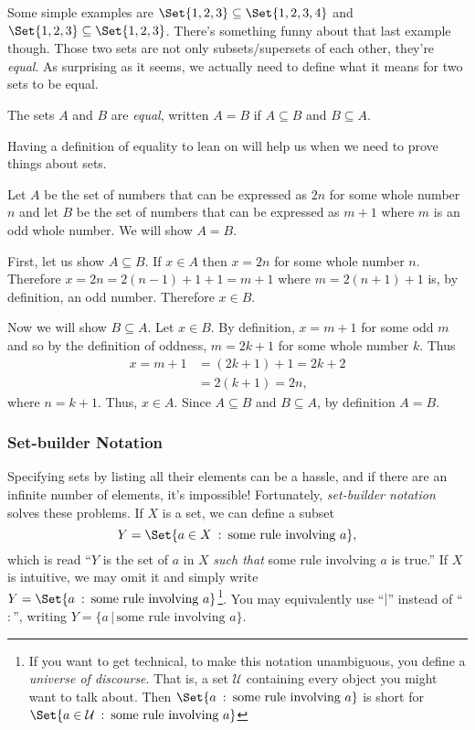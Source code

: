 	Some simple examples are $\Set{1,2,3}\subseteq \Set{1,2,3,4}$ and $\Set{1,2,3}\subseteq\Set{1,2,3}$.
	There's something funny about that last example though.  Those two sets are not only subsets/supersets
	of each other, they're \emph{equal}.  As surprising as it seems, we actually need to define
	what it means for two sets to be equal.
	\begin{definition}
		The sets $A$ and $B$ are \emph{equal}, written $A=B$ if $A\subseteq B$ and $B\subseteq A$.
	\end{definition}
	Having a definition of equality to lean on will help us when we need to prove things about sets.

	\begin{example}
		Let $A$ be the set of numbers that can be expressed
		as $2n$ for some whole number $n$ and let $B$ be the
		set of numbers that can be expressed as $m+1$ where $m$ is
		an odd whole number.  We will show $A=B$.

		First, let us show $A\subseteq B$.  If $x\in A$ then $x=2n$
		for some whole number $n$.  Therefore $x=2n=2(n-1)+1+1=m+1$ where
		$m=2(n+1)+1$ is, by definition, an odd number.  Therefore $x\in B$.

		Now we will show $B\subseteq A$.  Let $x\in B$.  By definition,
		$x=m+1$ for some odd $m$ and so by the definition of oddness, $m=2k+1$
		for some whole number $k$.  Thus 
		\begin{align*}
			x=m+1&=(2k+1)+1=2k+2\\
			&=2(k+1)=2n,
		\end{align*} where $n=k+1$. Thus, $x\in A$.  Since $A\subseteq B$
		and $B\subseteq A$, by definition $A=B$.
	\end{example}
	

	\subsubsection{Set-builder Notation}
	Specifying sets by listing all their elements can be a hassle, and if there are an infinite
	number of elements, it's impossible!  Fortunately, \emph{set-builder notation}
	solves these problems.
	If $X$ is a set, we can define a subset 
	\[
		Y= \Set{a\in X\given\text{some rule involving }a},
	\]
	which is read ``$Y$ is the set of $a$ in $X$ \emph{such that} some rule
	involving $a$ is true.''  If $X$ is intuitive, we may omit it and
	simply write $Y=\Set{a\given\text{some rule involving }a}$\footnote{ If you want
	to get technical, to make this notation unambiguous, you define a 
	\emph{universe of discourse}.  That is, a set $\mathcal U$ containing
	every object you might want to talk about.  Then $\Set{a\given\text{some rule involving }a}$
	is short for $\Set{a\in\mathcal U\given\text{some rule involving }a}$}.  You may equivalently
	use ``$|$'' instead of ``$:$'', writing $Y=\{a\,|\,\text{some rule involving }a\}$.

